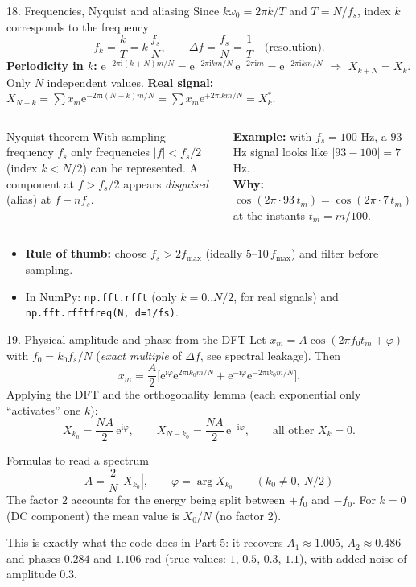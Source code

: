 \documentclass[aspectratio=169,10pt]{beamer}
\newcommand{\ii}{\mathrm{i}}
\newcommand{\ee}{\mathrm{e}}
\begin{document}
\begin{frame}{18. Frequencies, Nyquist and aliasing}
  \small
  Since $k\omega_0=2\pi k/T$ and $T=N/f_s$, index $k$ corresponds to the frequency
  \[
    f_k=\frac{k}{T}=k\,\frac{f_s}{N},\qquad\Delta f=\frac{f_s}{N}=\frac1T\quad\text{(resolution).}
  \]
  \textbf{Periodicity in $k$:} $\ee^{-2\pi\ii(k+N)m/N}=\ee^{-2\pi\ii km/N}\,\ee^{-2\pi\ii m}=\ee^{-2\pi\ii km/N}$ $\Rightarrow$ $X_{k+N}=X_k$. Only $N$ independent values.
  \textbf{Real signal:} $X_{N-k}=\sum x_m\ee^{-2\pi\ii(N-k)m/N}=\sum x_m\ee^{+2\pi\ii km/N}=X_k^{*}$.
  \begin{columns}[T]
    \begin{keybox}{Nyquist theorem}
      \footnotesize With sampling frequency $f_s$ only frequencies $|f|<f_s/2$ (index $k<N/2$) can be represented. A component at $f>f_s/2$ appears \emph{disguised} (alias) at $f-nf_s$.
    \end{keybox}
    \textbf{Example:} with $f_s=100$ Hz, a $93$ Hz signal looks like $|93-100|=7$ Hz.\\[2pt]
    \textbf{Why:} $\cos(2\pi\cdot93\,t_m)=\cos(2\pi\cdot7\,t_m)$ at the instants $t_m=m/100$.
  \end{columns}
  \begin{itemize}
    \item \textbf{Rule of thumb:} choose $f_s>2f_{\max}$ (ideally $5$--$10\,f_{\max}$) and filter before sampling.
    \item In NumPy: \texttt{np.fft.rfft} (only $k=0..N/2$, for real signals) and \texttt{np.fft.rfftfreq(N, d=1/fs)}.
  \end{itemize}
\end{frame}

\begin{frame}{19. Physical amplitude and phase from the DFT}
  \small
  Let $x_m=A\cos(2\pi f_0t_m+\varphi)$ with $f_0=k_0f_s/N$ (\emph{exact multiple} of $\Delta f$, see spectral leakage). Then
  \[
    x_m=\frac A2\Big[\ee^{\ii\varphi}\ee^{2\pi\ii k_0m/N}+\ee^{-\ii\varphi}\ee^{-2\pi\ii k_0m/N}\Big].
  \]
  Applying the DFT and the orthogonality lemma (each exponential only ``activates'' one $k$):
  \[
    X_{k_0}=\frac{NA}{2}\,\ee^{\ii\varphi},\qquad X_{N-k_0}=\frac{NA}{2}\,\ee^{-\ii\varphi},\qquad\text{all other }X_k=0 .
  \]
  \begin{keybox}{Formulas to read a spectrum}
    \[
      A=\frac{2}{N}\,|X_{k_0}|,\qquad\varphi=\arg X_{k_0}\qquad(k_0\neq0,\ N/2)
    \]
    The factor $2$ accounts for the energy being split between $+f_0$ and $-f_0$. For $k=0$ (DC component) the mean value is $X_0/N$ (no factor 2).
  \end{keybox}
  This is exactly what the code does in Part 5: it recovers $A_1\approx1.005$, $A_2\approx0.486$ and phases $0.284$ and $1.106$ rad (true values: $1$, $0.5$, $0.3$, $1.1$), with added noise of amplitude $0.3$.
\end{frame}
\end{document}
